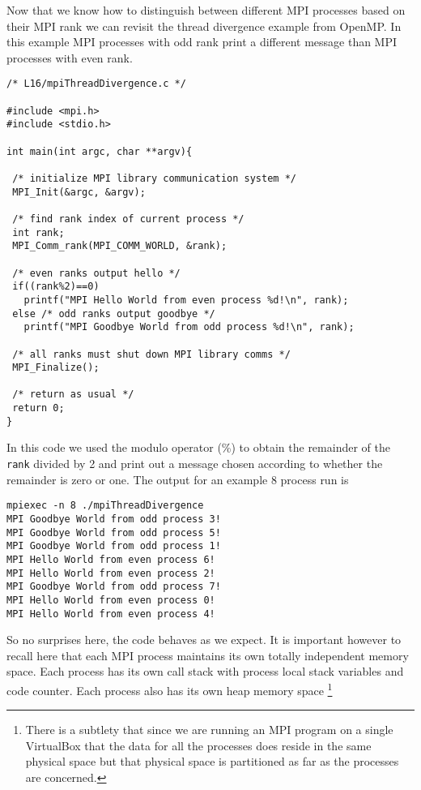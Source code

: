 Now that we know how to distinguish between different MPI processes based on their MPI rank we can revisit the thread divergence example from OpenMP. In this example MPI processes with odd rank print a different message than MPI processes with even rank.

\begin{verbatim}
/* L16/mpiThreadDivergence.c */

#include <mpi.h>
#include <stdio.h>

int main(int argc, char **argv){

 /* initialize MPI library communication system */
 MPI_Init(&argc, &argv);
 
 /* find rank index of current process */
 int rank;
 MPI_Comm_rank(MPI_COMM_WORLD, &rank);

 /* even ranks output hello */
 if((rank%2)==0)
   printf("MPI Hello World from even process %d!\n", rank);
 else /* odd ranks output goodbye */
   printf("MPI Goodbye World from odd process %d!\n", rank);
 
 /* all ranks must shut down MPI library comms */
 MPI_Finalize();
 
 /* return as usual */
 return 0;
}
\end{verbatim} 
In this code we used the modulo operator (\%) to obtain the remainder of the \texttt{rank} divided by 2 and print out a message chosen according to whether the remainder is zero or one. The output for an example 8 process run is 
\begin{Verbatim}[frame=single]
mpiexec -n 8 ./mpiThreadDivergence
MPI Goodbye World from odd process 3!
MPI Goodbye World from odd process 5!
MPI Goodbye World from odd process 1!
MPI Hello World from even process 6!
MPI Hello World from even process 2!
MPI Goodbye World from odd process 7!
MPI Hello World from even process 0!
MPI Hello World from even process 4!
\end{Verbatim}

So no surprises here, the code behaves as we expect. It is important however to recall here that each MPI process maintains its own totally independent memory space. Each process has its own call stack with process local stack variables and code counter. Each process also has its own heap memory space \footnote{There is a subtlety that since we are running an MPI program on a single VirtualBox that the data for all the processes does reside in the same physical space but that physical space is partitioned as far as the processes are concerned.}

